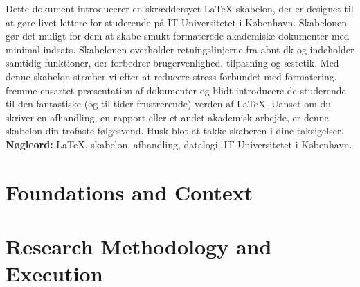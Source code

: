\documentclass[pnumromarab,noindentfirst]{abnt}
\begin{document}
\begin{resume}
Dette dokument introducerer en skr{\ae}ddersyet \LaTeX-skabelon, der er designet til at g{\o}re livet lettere for studerende p{\aa} IT-Universitetet i K{\o}benhavn. Skabelonen g{\o}r det muligt for dem at skabe smukt formaterede akademiske dokumenter med minimal indsats. Skabelonen overholder retningslinjerne fra \acrfull{abnt-dk} og indeholder samtidig funktioner, der forbedrer brugervenlighed, tilpasning og {\ae}stetik. Med denne skabelon str{\ae}ber vi efter at reducere stress forbundet med formatering, fremme ensartet pr{\ae}sentation af dokumenter og blidt introducere de studerende til den fantastiske (og til tider frustrerende) verden af \LaTeX. Uanset om du skriver en afhandling, en rapport eller et andet akademisk arbejde, er denne skabelon din trofaste f{\o}lgesvend. Husk blot at takke skaberen i dine taksigelser.\\
\textbf{N{\o}gleord:} \LaTeX, skabelon, afhandling, datalogi, IT-Universitetet i K{\o}benhavn.
\end{resume}


\listoffigures                                            %
\listoftables                                             %
\printglossary[title=List of Acronyms,type=\acronymtype]  %
\contents                                                 %



\part{Foundations and Context}\label{par:introduction}



\part{Research Methodology and Execution}\label{par:methodology}

\end{document}
